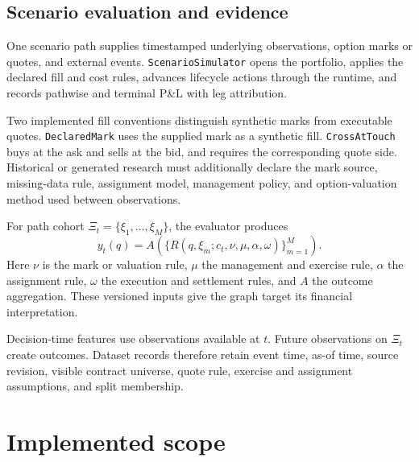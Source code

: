 \documentclass{strategynet-journal}
\begin{document}
\begin{SNcolumns}
\section{Scenario evaluation and evidence}
\label{sec:evaluation}

One scenario path supplies timestamped underlying observations, option marks
or quotes, and external events.  \texttt{ScenarioSimulator} opens the
portfolio, applies the declared fill and cost rules, advances lifecycle
actions through the runtime, and records pathwise and terminal P\&L with leg
attribution.

Two implemented fill conventions distinguish synthetic marks from executable quotes.
\texttt{DeclaredMark} uses the supplied mark as a synthetic fill.
\texttt{CrossAtTouch} buys at the ask and sells at the bid, and requires the
corresponding quote side.  Historical or generated research must additionally
declare the mark source, missing-data rule, assignment model, management
policy, and option-valuation method used between observations.

For path cohort \(\Xi_t=\{\xi_1,\ldots,\xi_M\}\), the evaluator produces
\[
  y_t(q)
  =A\left(
    \{R(q,\xi_m;c_t,\nu,\mu,\alpha,\omega)\}_{m=1}^{M}
  \right).
\]
Here \(\nu\) is the mark or valuation rule, \(\mu\) the management and exercise
rule, \(\alpha\) the assignment rule, \(\omega\) the execution and settlement
rules, and \(A\) the outcome aggregation.  These versioned inputs give the
graph target its financial interpretation.

Decision-time features use observations available at \(t\).  Future
observations on \(\Xi_t\) create outcomes.  Dataset records therefore retain
event time, as-of time, source revision, visible contract universe, quote
rule, exercise and assignment assumptions, and split membership.

\end{SNcolumns}

\section{Implemented scope}
\label{sec:implementation}
\end{document}
